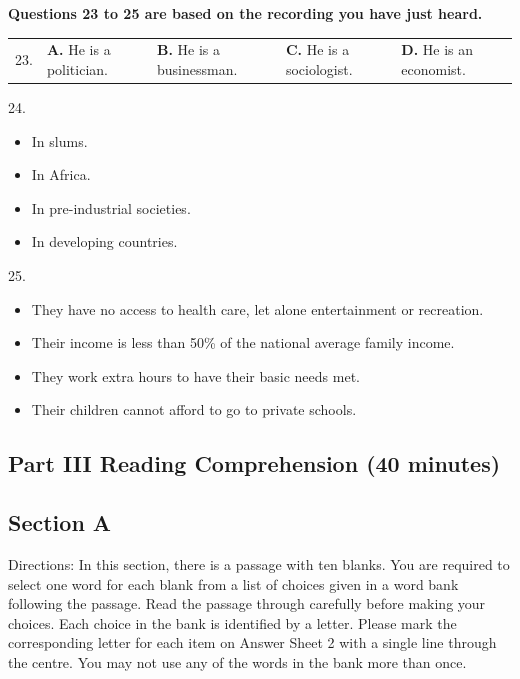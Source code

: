 \documentclass[UTF8,11pt]{ctexart}
\begin{document}
\textbf{Questions 23 to 25 are based on the recording you have just heard.}


\noindent\begin{tabularx}{\linewidth}{@{}lXXXX@{}}23. & \textbf{A.} He is a politician. & \textbf{B.} He is a businessman. & \textbf{C.} He is a sociologist. & \textbf{D.} He is an economist.\\\end{tabularx}\par

24.


\begin{itemize}[leftmargin=2em,itemsep=.2em,topsep=.4em]\item[A.] In slums.
\item[B.] In Africa.
\item[C.] In pre-industrial societies.
\end{itemize}

\begin{itemize}[leftmargin=2em,itemsep=.2em,topsep=.4em]\item[D.] In developing countries.
\end{itemize}

25.


\begin{itemize}[leftmargin=2em,itemsep=.2em,topsep=.4em]\item[A.] They have no access to health care, let alone entertainment or recreation.
\item[B.] Their income is less than 50\% of the national average family income.
\item[C.] They work extra hours to have their basic needs met.
\item[D.] Their children cannot afford to go to private schools.
\end{itemize}

\subsection*{\textbf{Part III Reading Comprehension (40 minutes)}}


\subsection*{\textbf{Section A}}


Directions: In this section, there is a passage with ten blanks. You are required to select one word for each blank from a list of choices given in a word bank following the passage. Read the passage through carefully before making your choices. Each choice in the bank is identified by a letter. Please mark the corresponding letter for each item on Answer Sheet 2 with a single line through the centre. You may not use any of the words in the bank more than once.
\end{document}
